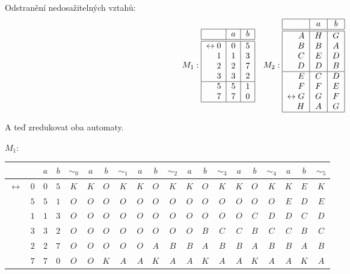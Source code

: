 Odstranění nedosažitelných vztahů:
\[
M_1:
\begin{tabular}{|r|c|c|}
    \hline
    & $a$ & $b$\\
    \hline
    \hline
    $\leftrightarrow 0$& $0$ & $5$\\
    $1$                & $1$ & $3$\\
    $2$                & $2$ & $7$\\
    $3$                & $3$ & $2$\\
    \hline
    $5$                & $5$ & $1$\\
    $7$                & $7$ & $0$\\
    \hline
\end{tabular}
\quad
M_2:
\begin{tabular}{|r|c|c|}
    \hline
    & $a$ & $b$\\
    \hline
    \hline
    $A$                & $H$ & $G$\\
    $B$                & $B$ & $A$\\
    $C$                & $E$ & $D$\\
    $D$                & $D$ & $B$\\
    \hline
    $E$                & $C$ & $D$\\
    $F$                & $F$ & $E$\\
    $\leftrightarrow G$& $G$ & $F$\\
    $H$                & $A$ & $G$\\
    \hline
\end{tabular}
\]

A teď zredukovat oba automaty.

$M_1$:
\begin{tabular}{|r r|c c|c|c c|c|c c|c|c c|c|c c|c|c c|c|}
    \hline
    & & $a$ & $b$ & $\sim_0$ & $a$ & $b$ & $\sim_1$ & $a$ & $b$ & $\sim_2$ & $a$ & $b$ & $\sim_3$ & $a$ & $b$ & $\sim_4$ & $a$ & $b$ & $\sim_5$ \\ \hline \hline
    $\leftrightarrow$& $0$ &$0$ &$5$ &$K$ &$K$ &$O$ &$K$ &$K$ &$O$ &$K$ &$K$ &$O$ &$K$ &$K$ &$O$ &$K$ &$K$ &$E$ &$K$ \\
                     & $5$ &$5$ &$1$ &$O$ &$O$ &$O$ &$O$ &$O$ &$O$ &$O$ &$O$ &$O$ &$O$ &$O$ &$O$ &$O$ &$E$ &$D$ &$E$ \\
                     & $1$ &$1$ &$3$ &$O$ &$O$ &$O$ &$O$ &$O$ &$O$ &$O$ &$O$ &$O$ &$O$ &$O$ &$C$ &$D$ &$D$ &$C$ &$D$ \\
                     & $3$ &$3$ &$2$ &$O$ &$O$ &$O$ &$O$ &$O$ &$O$ &$O$ &$O$ &$B$ &$C$ &$C$ &$B$ &$C$ &$C$ &$B$ &$C$ \\
                     & $2$ &$2$ &$7$ &$O$ &$O$ &$O$ &$O$ &$O$ &$A$ &$B$ &$B$ &$A$ &$B$ &$B$ &$A$ &$B$ &$B$ &$A$ &$B$ \\
                     & $7$ &$7$ &$0$ &$O$ &$O$ &$K$ &$A$ &$A$ &$K$ &$A$ &$A$ &$K$ &$A$ &$A$ &$K$ &$A$ &$A$ &$K$ &$A$ \\
    \hline
\end{tabular}

